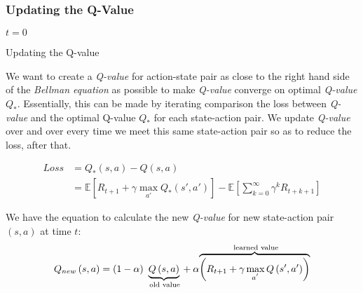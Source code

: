 \documentclass{article}
\begin{document}
\subsubsection*{Updating the Q-Value}

\newcommand\mycommfont[1]{\small\ttfamily\textcolor{blue}{#1}}


\begin{algorithm} 
    $t = 0$
    
    \caption{Updating the Q-value}
\end{algorithm}


We want to create a \textit{Q-value} for action-state pair as close to the right hand side of the \textit{Bellman equation} as possible to make \textit{Q-value} converge on optimal \textit{Q-value} $Q_{*}$. Essentially, this can be made by iterating comparison the loss between \textit{Q-value} and the optimal Q-value $Q_{*}$ for each state-action pair. We update \textit{Q-value} over and over every time we meet this same state-action pair so as to reduce the loss, after that.

\begin{align}
    Loss &= Q_{*}(s, a) - Q(s, a) \nonumber \\
         &= \mathbb{E}\left[R_{t+1} + \gamma \underset{a'}{\max}Q_{*}(s', a')\right] - \mathbb{E}\left[\sum_{k=0}^{\infty} \gamma^kR_{t+k+1}\right]
\end{align}

We have the equation to calculate the new \textit{Q-value} for new state-action pair $(s, a)$ at time $t$:
\begin{equation} 
Q_{new}\left( s,a\right) =\left( 1-\alpha \right) ~\underset{\text{old value} }{\underbrace{Q\left( s,a\right) }\rule[-0.05in]{0in}{0.2in} \rule[-0.05in]{0in}{0.2in}\rule[-0.1in]{0in}{0.3in}}+\alpha \overset{\text{ learned value}}{\overbrace{\left(R_{t+1}+\gamma \max_{a^{^{\prime }}}Q\left( s^{\prime },a^{\prime }\right) \right) }} 
\end{equation}
\end{document}
